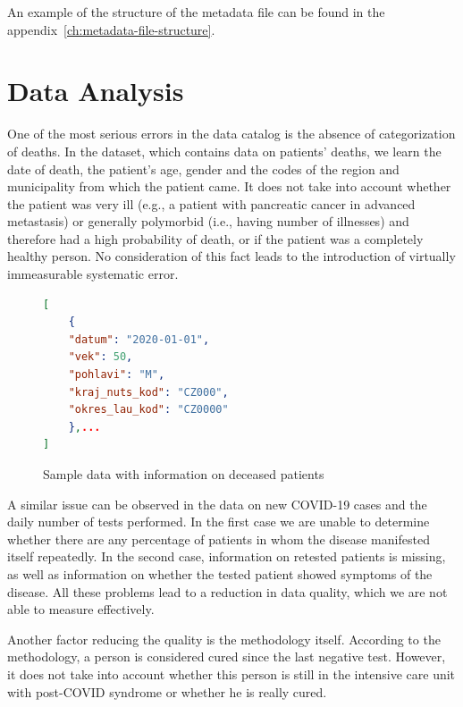 An example of the structure of the metadata file can be found in the appendix~\ref{ch:metadata-file-structure}.

\section{Data Analysis}

One of the most serious errors in the data catalog is the absence of categorization of deaths.
In the dataset, which contains data on patients' deaths, we learn the date of death, the patient's age, gender and the codes of the region and municipality from which the patient came.
It does not take into account whether the patient was very ill (e.g., a patient with pancreatic cancer in advanced metastasis) or generally polymorbid (i.e., having number of illnesses) and therefore had a high probability of death, or if the patient was a completely healthy person.
No consideration of this fact leads to the introduction of virtually immeasurable systematic error.

\begin{figure}[htb]
    \centering
    
    \begin{lstlisting}[language=json,firstnumber=1]
[
    {
    "datum": "2020-01-01",
    "vek": 50,
    "pohlavi": "M",
    "kraj_nuts_kod": "CZ000",
    "okres_lau_kod": "CZ0000"
    },...
]
    \end{lstlisting}

    \caption{Sample data with information on deceased patients}
    \label{ls:sample-data-deceased}
\end{figure}
\FloatBarrier

A similar issue can be observed in the data on new COVID-19 cases and the daily number of tests performed.
In the first case we are unable to determine whether there are any percentage of patients in whom the disease manifested itself repeatedly.
In the second case, information on retested patients is missing, as well as information on whether the tested patient showed symptoms of the disease.
All these problems lead to a reduction in data quality, which we are not able to measure effectively.

Another factor reducing the quality is the methodology itself.
According to the methodology, a person is considered cured since the last negative test.
However, it does not take into account whether this person is still in the intensive care unit with post-COVID syndrome or whether he is really cured.

